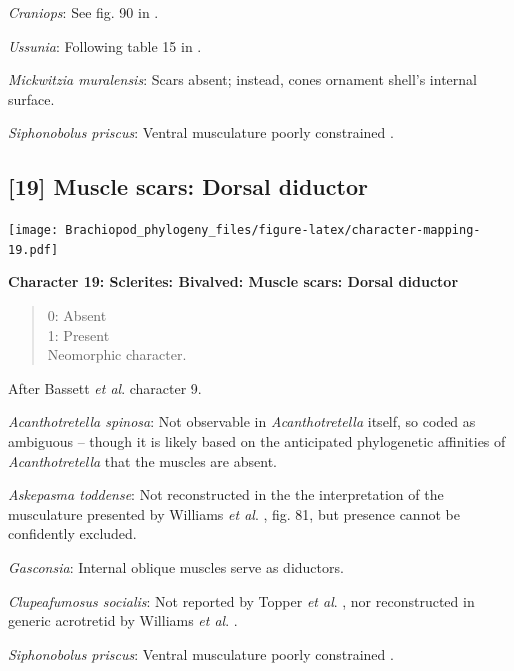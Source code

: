 \documentclass[]{book}
\theoremstyle{definition}
\theoremstyle{definition}
\theoremstyle{definition}
\theoremstyle{remark}
\begin{document}
\emph{Craniops}: See fig. 90 in
\citet{Williams2000BrachiopodaLinguliformea}.

\emph{Ussunia}: Following table 15 in
\citet{Williams2000BrachiopodaLinguliformea}.

\emph{Mickwitzia muralensis}: Scars absent; instead, cones ornament
shell's internal surface.

\emph{Siphonobolus priscus}: Ventral musculature poorly constrained
\citep{Williams2000BrachiopodaLinguliformea, Popov2009Earlyontogeny}.

\hypertarget{muscle-scars-dorsal-diductor}{%
\subsection*{{[}19{]} Muscle scars: Dorsal
diductor}\label{muscle-scars-dorsal-diductor}}

\texttt{[image: Brachiopod\_phylogeny\_files/figure-latex/character-mapping-19.pdf]}

\textbf{Character 19: Sclerites: Bivalved: Muscle scars: Dorsal
diductor}

\begin{quote}
0: Absent\\
1: Present\\
Neomorphic character.
\end{quote}

After Bassett \emph{et al}.
\citeyearpar{Bassett2001Functionalmorphology} character 9.

\emph{Acanthotretella spinosa}: Not observable in \emph{Acanthotretella}
itself, so coded as ambiguous -- though it is likely based on the
anticipated phylogenetic affinities of \emph{Acanthotretella} that the
muscles are absent.

\emph{Askepasma toddense}: Not reconstructed in the the interpretation
of the musculature presented by Williams \emph{et al}.
\citeyearpar{Williams2000BrachiopodaLinguliformea}, fig. 81, but
presence cannot be confidently excluded.

\emph{Gasconsia}: Internal oblique muscles serve as diductors.

\emph{Clupeafumosus socialis}: Not reported by Topper \emph{et al}.
\citeyearpar{Topper2013Reappraisalof}, nor reconstructed in generic
acrotretid by Williams \emph{et al}.
\citeyearpar{Williams2000BrachiopodaLinguliformea}.

\emph{Siphonobolus priscus}: Ventral musculature poorly constrained
\citep{Williams2000BrachiopodaLinguliformea, Popov2009Earlyontogeny}.
\end{document}
